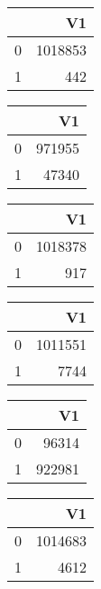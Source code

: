 \bigskip\bigskip
\centering
\begin{tabular}{rr}
  \hline
 & V1 \\ 
  \hline
0 & 1018853 \\ 
  1 & 442 \\ 
   \hline
\end{tabular}

\bigskip\bigskip
\centering
\begin{tabular}{rr}
  \hline
 & V1 \\ 
  \hline
0 & 971955 \\ 
  1 & 47340 \\ 
   \hline
\end{tabular}

\bigskip\bigskip
\centering
\begin{tabular}{rr}
  \hline
 & V1 \\ 
  \hline
0 & 1018378 \\ 
  1 & 917 \\ 
   \hline
\end{tabular}

\bigskip\bigskip
\centering
\begin{tabular}{rr}
  \hline
 & V1 \\ 
  \hline
0 & 1011551 \\ 
  1 & 7744 \\ 
   \hline
\end{tabular}

\bigskip\bigskip
\centering
\begin{tabular}{rr}
  \hline
 & V1 \\ 
  \hline
0 & 96314 \\ 
  1 & 922981 \\ 
   \hline
\end{tabular}

\bigskip\bigskip
\centering
\begin{tabular}{rr}
  \hline
 & V1 \\ 
  \hline
0 & 1014683 \\ 
  1 & 4612 \\ 
   \hline
\end{tabular}

